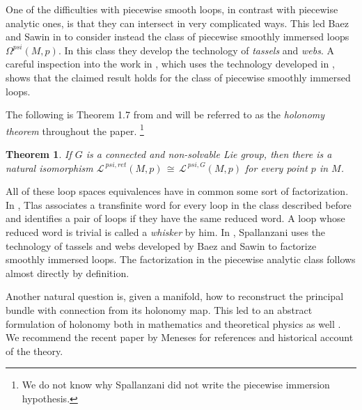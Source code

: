 \documentclass{amsart}
\newtheorem{theorem}{Theorem}[section]
\begin{document}
One of the difficulties with piecewise smooth loops, in contrast with piecewise analytic ones, is that they can intersect in very complicated ways. This led Baez and Sawin in \cite{BaezSawin} to consider instead the class of piecewise smoothly immersed loops $\Omega^{psi}(M,p)$. In this class they develop the technology of \emph{tassels} and \emph{webs}. A careful inspection into the work in \cite{Holonomy}, which uses the technology developed in \cite{BaezSawin}, shows that the claimed result holds for the class of piecewise smoothly immersed loops.  


The following is Theorem 1.7 from \cite{Holonomy} and will be referred to as the \emph{holonomy theorem} throughout the paper.   \footnote{We do not know why Spallanzani did not write the piecewise immersion hypothesis.}



\begin{theorem}\label{spa}
If $G$ is a connected and non-solvable Lie group, then there is a natural isomorphism $\mathcal L^{\ psi, ret}(M,p)\,\cong\, \mathcal{L}^{\ psi, G}(M,p)$ for every point $p$ in $M$.
\end{theorem}




All of these loop spaces equivalences have in common some sort of factorization. In \cite{Tlas}, Tlas associates a transfinite word for every loop in the class described before and identifies a pair of loops if they have the same reduced word. A loop whose reduced word is trivial is called a \emph{whisker} by him. In \cite{Holonomy}, Spallanzani uses the technology of tassels and webs developed by Baez and Sawin \cite{BaezSawin} to factorize smoothly immersed loops. The factorization in the piecewise analytic class follows almost directly by definition.%



Another natural question is, given a manifold, how to reconstruct the principal bundle with connection from its holonomy map. This led to an abstract formulation of holonomy both in mathematics \cite{Milnor, Lashof, Teleman1, Teleman2} and theoretical physics as well \cite{Barret, BaezSawin, Gambini, Loll}. We recommend the recent paper \cite{Meneses} by Meneses for references and historical account of the theory.


\end{document}
